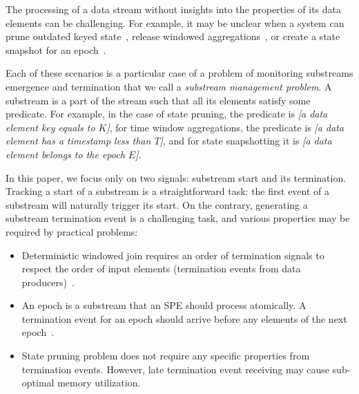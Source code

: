 \label {fs-acker-intro}

The processing of a data stream without insights into the properties of its data elements can be challenging. For example, it may be unclear when a system can prune outdated keyed state~\cite{Tucker:2003:EPS:776752.776780}, release windowed aggregations~\cite{Begoli:2019:OSR:3299869.3314040}, or create a state snapshot for an epoch~\cite{Carbone:2017:SMA:3137765.3137777}.

Each of these scenarios is a particular case of a problem of monitoring substreams emergence and termination that we call a {\em substream management problem}. A substream is a part of the stream such that all its elements satisfy some predicate. 
For example, in the case of state pruning, the predicate is {\em [a data element key equals to $K$]}, for time window aggregations, the predicate is {\em [a data element has a timestamp less than $T$]}, and for state snapshotting it is {\em [a data element belongs to the epoch $E$]}.

In this paper, we focus only on two signals: substream start and its termination. Tracking a start of a substream is a straightforward task: the first event of a substream will naturally trigger its start. On the contrary, generating a substream termination event is a challenging task, and various properties may be required by practical problems:
\begin{itemize}
    \item Deterministic windowed join requires an order of termination signals to respect the order of input elements (termination events from data producers)~\cite{najdataei2019stretch, gulisano2016scalejoin}.
    \item An epoch is a substream that an SPE should process atomically. A termination event for an epoch should arrive before any elements of the next epoch~\cite{2015arXiv150608603C}.
    \item State pruning problem does not require any specific properties from termination events. However, late termination event receiving may cause sub-optimal memory utilization.
\end{itemize}

